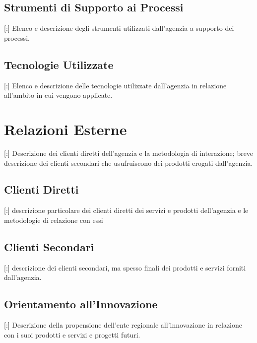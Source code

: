 \subsection{Strumenti di Supporto ai Processi}

[:] Elenco e descrizione degli strumenti utilizzati dall'agenzia a supporto dei processi.

\subsection{Tecnologie Utilizzate}

[:] Elenco e descrizione delle tecnologie utilizzate dall'agenzia in relazione all'ambito in cui vengono applicate.

\section{Relazioni Esterne}

[:] Descrizione dei clienti diretti dell'agenzia e la metodologia di interazione; breve descrizione dei clienti secondari che usufruiscono dei prodotti erogati dall'agenzia.

\subsection{Clienti Diretti}

[:]  descrizione particolare dei clienti diretti dei servizi e prodotti dell'agenzia e le metodologie di relazione con essi

\subsection{Clienti Secondari}

[:] descrizione dei clienti secondari, ma spesso finali dei prodotti e servizi forniti dall'agenzia.

\subsection{Orientamento all'Innovazione}

[:] Descrizione della propensione dell'ente regionale all'innovazione in relazione con i suoi prodotti e servizi e progetti futuri.

